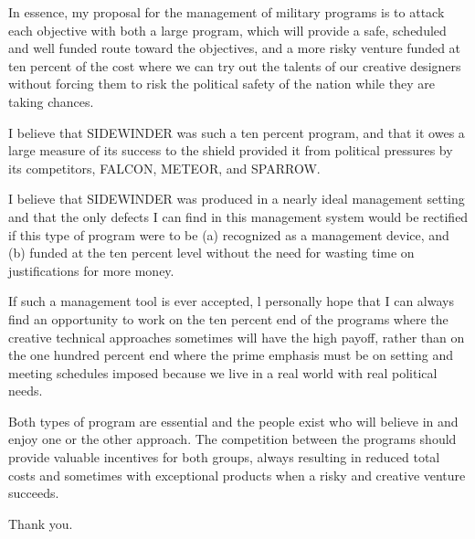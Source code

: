 \documentclass{memoir}
\begin{document}
In essence, my proposal for the management of military programs is to attack each objective with both a large program, which will provide a safe, scheduled and well funded route toward the objectives, and a more risky venture funded at ten percent of the cost where we can try out the talents of our creative designers without forcing them to risk the political safety of the nation while they are taking chances.

I believe that SIDEWINDER was such a ten percent program, and that it owes a large measure of its success to the shield provided it from political pressures by its competitors, FALCON, METEOR, and SPARROW.

I believe that SIDEWINDER was produced in a nearly ideal management setting and that the only defects I can find in this management system would be rectified if this type of program were to be (a) recognized as a management device, and (b) funded at the ten percent level without the need for wasting time on justifications for more money.

If such a management tool is ever accepted, l personally hope that I can always find an opportunity to work on the ten percent end of the programs where the creative technical approaches sometimes will have the high payoff, rather than on the one hundred percent end where the prime emphasis must be on setting and meeting schedules imposed because we live in a real world with real political needs.

Both types of program are essential and the people exist who will believe in and enjoy one or the other approach. The competition between the programs should provide valuable incentives for both groups, always resulting in reduced total costs and sometimes with exceptional products when a risky and creative venture succeeds.

Thank you.

\printbibliography
\end{document}
